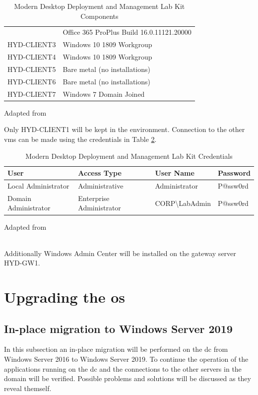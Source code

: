 \begin{table}[ht]
\begin{adjustbox}{width=1\textwidth}
\begin{tabular}{l|l}
		& Office 365 ProPlus Build 16.0.11121.20000                           									 \\
		HYD-CLIENT3  & Windows 10 1809 Workgroup                                         						  \\
		HYD-CLIENT4  & Windows 10 1809 Workgroup                                          						   \\
		HYD-CLIENT5 & Bare metal (no installations)                                      						    \\
		HYD-CLIENT6 & Bare metal (no installations)                                       							 \\
		HYD-CLIENT7  & Windows 7 Domain Joined                                            
	\end{tabular}
	\end{adjustbox}
	\caption[Lab Kit Components]{Modern Desktop Deployment and Management Lab Kit Components}
	\scriptsize	
	Adapted from \cite{MicrosoftCorporation2019}
	\label{tab:MDDMLK2016}
\end{table}

	
Only HYD-CLIENT1 will be kept in the environment. Connection to the other \acrshort{vm}s can be made using the credentials in Table \ref{tab:MDDMLKC2016}.
\begin{table}[ht]
	\centering
	\begin{adjustbox}{width=1\textwidth}
	\begin{tabular}{l|lll}
		User                 & Access Type              & User Name                    & Password \\
		\hline
		Local Administrator  & Administrative           & Administrator                & P@ssw0rd \\
		Domain Administrator & Enterprise Administrator & CORP\textbackslash{}LabAdmin & P@ssw0rd
	\end{tabular}
	\end{adjustbox}
	\caption[Lab Kit Credentials]{Modern Desktop Deployment and Management Lab Kit Credentials}
	\scriptsize	
	Adapted from \cite{MicrosoftCorporation2019}
	\label{tab:MDDMLKC2016}
\end{table}
\\
Additionally Windows Admin Center will be installed on the gateway server HYD-GW1. 
\section{Upgrading the \acrshort{os}}
\subsection{In-place migration to Windows Server 2019}
In this subsection an in-place migration will be performed on the \acrfull{dc} from Windows Server 2016 to Windows Server 2019. To continue the operation of the applications running on the \acrshort{dc} and the connections to the other servers in the domain will be verified. Possible problems and solutions will be discussed as they reveal themself.

